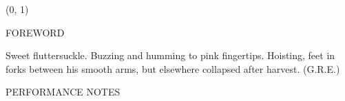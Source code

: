 \documentclass[11pt]{article}
\begin{document}
\begin{textblock}{23}(0, 1)
\begin{center}
\huge FOREWORD
\end{center}
\end{textblock}

\vspace*{0.25\baselineskip}

\begingroup
\begin{center}
Sweet fluttersuckle. Buzzing and humming to pink fingertips. Hoisting, feet in forks between his smooth arms, but elsewhere collapsed after harvest.
\rightskip\leftskip
\phantom{text} \hfill (G.R.E.)
\end{center}
\endgroup

\vspace*{1.25\baselineskip}

\begin{center}
\huge PERFORMANCE NOTES
\end{center}
\end{document}
